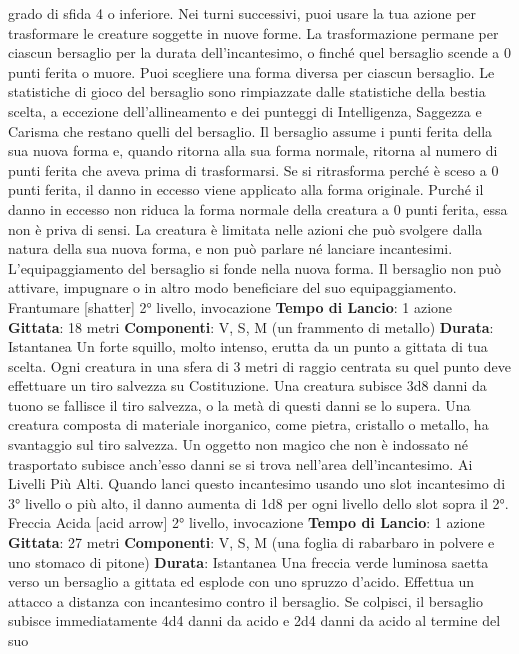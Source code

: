 \begin{multicols}{2}
grado di sfida 4 o inferiore. Nei turni successivi, puoi
usare la tua azione per trasformare le creature soggette
in nuove forme.
La trasformazione permane per ciascun bersaglio per la
durata dell’incantesimo, o finché quel bersaglio scende
a 0 punti ferita o muore. Puoi scegliere una forma
diversa per ciascun bersaglio. Le statistiche di gioco del
bersaglio sono rimpiazzate dalle statistiche della bestia
scelta, a eccezione dell’allineamento e dei punteggi di
Intelligenza, Saggezza e Carisma che restano quelli del
bersaglio. Il bersaglio assume i punti ferita della sua
nuova forma e, quando ritorna alla sua forma normale,
ritorna al numero di punti ferita che aveva prima di
trasformarsi. Se si ritrasforma perché è sceso a 0 punti
ferita, il danno in eccesso viene applicato alla forma
originale. Purché il danno in eccesso non riduca la
forma normale della creatura a 0 punti ferita, essa non
è priva di sensi. La creatura è limitata nelle azioni che
può svolgere dalla natura della sua nuova forma, e non
può parlare né lanciare incantesimi.
L’equipaggiamento del bersaglio si fonde nella nuova
forma. Il bersaglio non può attivare, impugnare o in altro
modo beneficiare del suo equipaggiamento.
Frantumare
[shatter]
2° livello, invocazione
\textbf{Tempo di Lancio}: 1 azione
\textbf{Gittata}: 18 metri
\textbf{Componenti}: V, S, M (un frammento di metallo)
\textbf{Durata}: Istantanea
Un forte squillo, molto intenso, erutta da un punto a
gittata di tua scelta. Ogni creatura in una sfera di 3
metri di raggio centrata su quel punto deve effettuare
un tiro salvezza su Costituzione. Una creatura subisce
3d8 danni da tuono se fallisce il tiro salvezza, o la metà
di questi danni se lo supera. Una creatura composta di
materiale inorganico, come pietra, cristallo o metallo, ha
svantaggio sul tiro salvezza.
Un oggetto non magico che non è indossato né
trasportato subisce anch’esso danni se si trova
nell’area dell’incantesimo.
Ai Livelli Più Alti. Quando lanci questo incantesimo
usando uno slot incantesimo di 3° livello o più alto, il
danno aumenta di 1d8 per ogni livello dello slot sopra il
2°.
Freccia Acida
[acid arrow]
2° livello, invocazione
\textbf{Tempo di Lancio}: 1 azione
\textbf{Gittata}: 27 metri
\textbf{Componenti}: V, S, M (una foglia di rabarbaro in
polvere e uno stomaco di pitone)
\textbf{Durata}: Istantanea
Una freccia verde luminosa saetta verso un bersaglio a
gittata ed esplode con uno spruzzo d’acido. Effettua un
attacco a distanza con incantesimo contro il bersaglio.
Se colpisci, il bersaglio subisce immediatamente 4d4
danni da acido e 2d4 danni da acido al termine del suo

\end{multicols}
